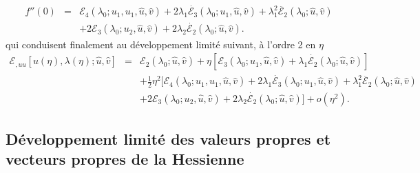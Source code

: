 \documentclass{article}
\newcommand{\nocomma}{}
\newcommand{\nosymbol}{}
\begin{document}
\begin{eqnarray}
  f'' (0) & = & \mathcal{E}_4 (\lambda_0 ; u_1, u_1, \hat{u}, \hat{v}) + 2
  \lambda_1  \dot{\mathcal{E}_3} (\lambda_0 ; u_1, \hat{u}, \hat{v}) +
  \lambda_1^2  \ddot{\mathcal{E}_2} (\lambda_0 ; \hat{u}, \hat{v}) \nonumber\\
  &  & \nosymbol + 2\mathcal{E}_3 (\lambda_0 ; u_2, \hat{u}, \hat{v}) + 2
  \lambda_2  \dot{\mathcal{E}_2} (\lambda_0 ; \hat{u}, \hat{v}) .
\end{eqnarray}
qui conduisent finalement au d{\'e}veloppement limit{\'e} suivant, {\`a}
l'ordre 2 en $\eta$
\begin{eqnarray}
  \mathcal{E}_{, u \nocomma u} [u (\eta), \lambda (\eta) ; \hat{u}, \hat{v}] &
  = & \mathcal{E}_2 (\lambda_0 ; \hat{u}, \hat{v}) + \eta [\mathcal{E}_3
  (\lambda_0 ; u_1, \hat{u}, \hat{v})   + \lambda_1
  \dot{\mathcal{E}_2} (\lambda_0 ; \hat{u}, \hat{v})] \nonumber\\
  &  & \nosymbol + \tfrac{1}{2} \eta^2  [\mathcal{E}_4 (\lambda_0 ; u_1, u_1,
  \hat{u}, \hat{v})  + 2 \lambda_1  \dot{\mathcal{E}_3} (\lambda_0 ;
  u_1, \hat{u}, \hat{v}) + \lambda_1^2  \ddot{\mathcal{E}_2} (\lambda_0 ;
  \hat{u}, \hat{v}) \nonumber\\
  &  & \nosymbol  + 2\mathcal{E}_3 (\lambda_0 ; u_2, \hat{u},
  \hat{v}) + 2 \lambda_2  \dot{\mathcal{E}_2} (\lambda_0 ; \hat{u}, \hat{v})]
  + o (\eta^2) .
\end{eqnarray}

\subsection{D{\'e}veloppement limit{\'e} des valeurs propres et vecteurs
propres de la Hessienne}
\end{document}
